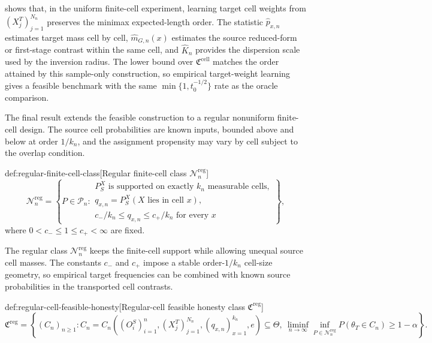  shows that, in the uniform finite-cell experiment, learning target cell weights from \((X_j^T)_{j=1}^{N_n}\) preserves the minimax expected-length order. The statistic \(\widehat p_{x,n}\) estimates target mass cell by cell, \(\widehat m_{G,n}(x)\) estimates the source reduced-form or first-stage contrast within the same cell, and \(\widehat K_n\) provides the dispersion scale used by the inversion radius. The lower bound over \(\mathfrak C^{\mathrm{cell}}\) matches the order attained by this sample-only construction, so empirical target-weight learning gives a feasible benchmark with the same \(\min\{1,t_0^{-1/2}\}\) rate as the oracle comparison.

The final result extends the feasible construction to a regular nonuniform finite-cell design. The source cell probabilities are known inputs, bounded above and below at order \(1/k_n\), and the assignment propensity may vary by cell subject to the overlap condition.

\begin{definitionv}{def:regular-finite-cell-class}[Regular finite-cell class \(\mathcal N_n^{\mathrm{reg}}\)]
\[
\mathcal N_n^{\mathrm{reg}}
=
\left\{
P\in\mathcal P_n:
\begin{array}{l}
P_S^X \text{ is supported on exactly } k_n \text{ measurable cells},\\
q_{x,n}=P_S^X(X \text{ lies in cell } x),\\
c_-/k_n\le q_{x,n}\le c_+/k_n \text{ for every } x
\end{array}
\right\},
\]
where \(0<c_-\le 1\le c_+<\infty\) are fixed.
\end{definitionv}

The regular class \(\mathcal N_n^{\mathrm{reg}}\) keeps the finite-cell support while allowing unequal source cell masses. The constants \(c_-\) and \(c_+\) impose a stable order-\(1/k_n\) cell-size geometry, so empirical target frequencies can be combined with known source probabilities in the transported cell contrasts.

\begin{definitionv}{def:regular-cell-feasible-honesty}[Regular-cell feasible honesty class \(\mathfrak C^{\mathrm{reg}}\)]
\[
\mathfrak C^{\mathrm{reg}}
=
\left\{
(C_n)_{n\ge 1}:
C_n
=
C_n\left(
(O_i^S)_{i=1}^n,
(X_j^T)_{j=1}^{N_n},
(q_{x,n})_{x=1}^{k_n},e
\right)
\subseteq \Theta,\ 
\liminf_{n\to\infty}\inf_{P\in\mathcal N_n^{\mathrm{reg}}}
P(\theta_T\in C_n)\ge 1-\alpha
\right\}.
\]
\end{definitionv}

